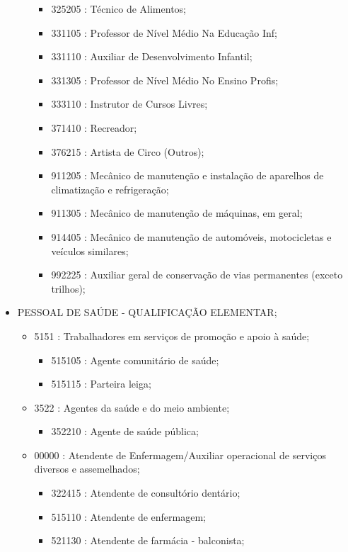 \begin{itemize}
\begin{itemize}
\begin{itemize}
      \item 325205 : Técnico de Alimentos;
      \item 331105 : Professor de Nível Médio Na Educação Inf;
      \item 331110 : Auxiliar de Desenvolvimento Infantil;
      \item 331305 : Professor de Nível Médio No Ensino Profis;
      \item 333110 : Instrutor de Cursos Livres;
      \item 371410 : Recreador;
      \item 376215 : Artista de Circo (Outros);
      \item 911205 : Mecânico de manutenção e instalação de aparelhos de climatização e refrigeração;
      \item 911305 : Mecânico de manutenção de máquinas, em geral;
      \item 914405 : Mecânico de manutenção de automóveis, motocicletas e veículos similares;
      \item 992225 : Auxiliar geral de conservação de vias permanentes (exceto trilhos);
    \end{itemize}
  \end{itemize}
  \item PESSOAL DE SAÚDE - QUALIFICAÇÃO ELEMENTAR;
  \begin{itemize}
    \item 5151 : Trabalhadores em serviços de promoção e apoio à saúde;
    \begin{itemize}
      \item 515105 : Agente comunitário de saúde;
      \item 515115 : Parteira leiga;
    \end{itemize}
    \item 3522 : Agentes da saúde e do meio ambiente;
    \begin{itemize}
      \item 352210 : Agente de saúde pública;
    \end{itemize}
    \item 00000 : Atendente de Enfermagem/Auxiliar operacional de serviços diversos e assemelhados;
    \begin{itemize}
      \item 322415 : Atendente de consultório dentário;
      \item 515110 : Atendente de enfermagem;
      \item 521130 : Atendente de farmácia - balconista;
    \end{itemize}

\end{itemize}
\end{itemize}
